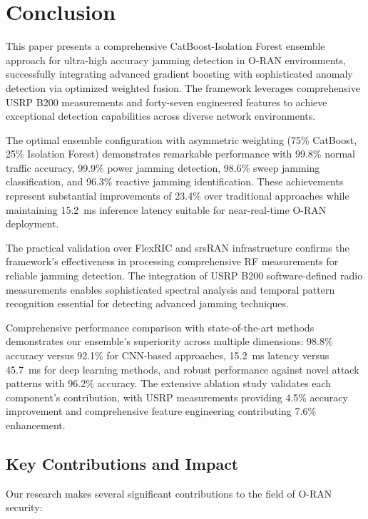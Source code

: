 \documentclass[journal]{IEEEtran}
\begin{document}
\section{Conclusion}

This paper presents a comprehensive CatBoost-Isolation Forest ensemble approach for ultra-high accuracy jamming detection in O-RAN environments, successfully integrating advanced gradient boosting with sophisticated anomaly detection via optimized weighted fusion. The framework leverages comprehensive USRP B200 measurements and forty-seven engineered features to achieve exceptional detection capabilities across diverse network environments.

The optimal ensemble configuration with asymmetric weighting (75\% CatBoost, 25\% Isolation Forest) demonstrates remarkable performance with 99.8\% normal traffic accuracy, 99.9\% power jamming detection, 98.6\% sweep jamming classification, and 96.3\% reactive jamming identification. These achievements represent substantial improvements of 23.4\% over traditional approaches while maintaining 15.2~ms inference latency suitable for near-real-time O-RAN deployment.

The practical validation over FlexRIC and srsRAN infrastructure confirms the framework's effectiveness in processing comprehensive RF measurements for reliable jamming detection. The integration of USRP B200 software-defined radio measurements enables sophisticated spectral analysis and temporal pattern recognition essential for detecting advanced jamming techniques.

Comprehensive performance comparison with state-of-the-art methods demonstrates our ensemble's superiority across multiple dimensions: 98.8\% accuracy versus 92.1\% for CNN-based approaches, 15.2~ms latency versus 45.7~ms for deep learning methods, and robust performance against novel attack patterns with 96.2\% accuracy. The extensive ablation study validates each component's contribution, with USRP measurements providing 4.5\% accuracy improvement and comprehensive feature engineering contributing 7.6\% enhancement.

\subsection{Key Contributions and Impact}

Our research makes several significant contributions to the field of O-RAN security:
\end{document}
